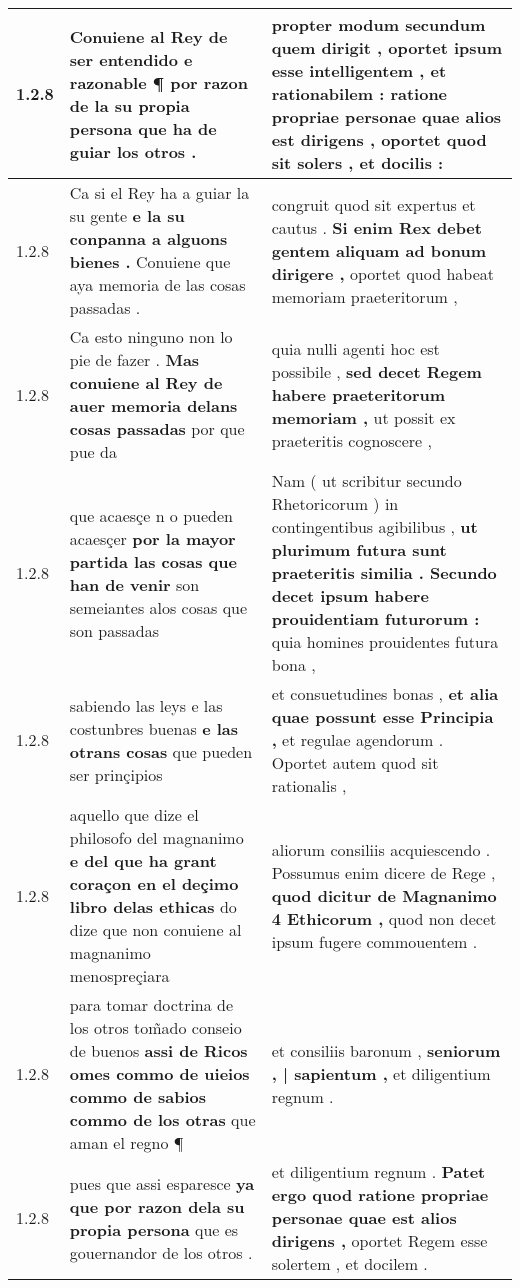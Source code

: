 \begin{tabular}{|p{1cm}|p{6.5cm}|p{6.5cm}|}
1.2.8 & Conuiene al Rey de ser entendido e razonable ¶ \textbf{ por razon de la su propia persona } que ha de guiar los otros . & propter modum \textbf{ secundum quem dirigit , oportet ipsum esse intelligentem , et rationabilem : ratione propriae personae } quae alios est dirigens , oportet quod sit solers , et docilis : \\\hline
1.2.8 & Ca si el Rey ha a guiar la su gente \textbf{ e la su conpanna a alguons bienes . } Conuiene que aya memoria de las cosas passadas . & congruit quod sit expertus et cautus . \textbf{ Si enim Rex debet gentem aliquam ad bonum dirigere , } oportet quod habeat memoriam praeteritorum , \\\hline
1.2.8 & Ca esto ninguno non lo pie de fazer . \textbf{ Mas conuiene al Rey de auer memoria delans cosas passadas } por que pue da & quia nulli agenti hoc est possibile , \textbf{ sed decet Regem habere praeteritorum memoriam , } ut possit ex praeteritis cognoscere , \\\hline
1.2.8 & que acaesçe n o pueden acaesçer \textbf{ por la mayor partida las cosas que han de venir } son semeiantes alos cosas que son passadas & Nam ( ut scribitur secundo Rhetoricorum ) in contingentibus agibilibus , \textbf{ ut plurimum futura sunt praeteritis similia . Secundo decet ipsum habere prouidentiam futurorum : } quia homines prouidentes futura bona , \\\hline
1.2.8 & sabiendo las leys e las costunbres buenas \textbf{ e las otrans cosas } que pueden ser prinçipios & et consuetudines bonas , \textbf{ et alia quae possunt esse Principia , } et regulae agendorum . Oportet autem quod sit rationalis , \\\hline
1.2.8 & aquello que dize el philosofo del magnanimo \textbf{ e del que ha grant coraçon en el deçimo libro delas ethicas } do dize que non conuiene al magnanimo menospreçiara & aliorum consiliis acquiescendo . Possumus enim dicere de Rege , \textbf{ quod dicitur de Magnanimo 4 Ethicorum , } quod non decet ipsum fugere commouentem . \\\hline
1.2.8 & para tomar doctrina de los otros tom̃ado conseio de buenos \textbf{ assi de Ricos omes commo de uieios commo de sabios commo de los otras } que aman el regno ¶ & et consiliis baronum , \textbf{ seniorum , | sapientum , } et diligentium regnum . \\\hline
1.2.8 & pues que assi esparesce \textbf{ ya que por razon dela su propia persona } que es gouernandor de los otros . & et diligentium regnum . \textbf{ Patet ergo quod ratione propriae personae quae est alios dirigens , } oportet Regem esse solertem , et docilem . \\\hline

\end{tabular}
